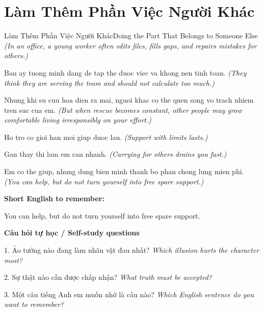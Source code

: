 \section{Làm Thêm Phần Việc Người Khác}
\begin{truyen}{Làm Thêm Phần Việc Người Khác}{Doing the Part That Belongs to Someone Else}
\textit{(In an office, a young worker often edits files, fills gaps, and repairs mistakes for others.)}

Ban ay tuong minh dang de tap the duoc viec va khong nen tinh toan.
\textit{(They think they are serving the team and should not calculate too much.)}

Nhung khi su cuu hoa dien ra mai, nguoi khac co the quen song vo trach nhiem tren suc cua em.
\textit{(But when rescue becomes constant, other people may grow comfortable living irresponsibly on your effort.)}

Ho tro co gioi han moi giup duoc lau.
\textit{(Support with limits lasts.)}

Gan thay thi lam em can nhanh.
\textit{(Carrying for others drains you fast.)}

\end{truyen}

\begin{baihoc}
Em co the giup, nhung dung bien minh thanh bo phan chong lung mien phi.
\textit{(You can help, but do not turn yourself into free spare support.)}
\end{baihoc}

\begin{ghinhoanh}
\textbf{Short English to remember:}

You can help, but do not turn yourself into free spare support.

\end{ghinhoanh}

\begin{tuhocnhanh}
\textbf{Câu hỏi tự học / Self-study questions}

1. Ảo tưởng nào đang làm nhân vật đau nhất? \textit{Which illusion hurts the character most?}

2. Sự thật nào cần được chấp nhận? \textit{What truth must be accepted?}

3. Một câu tiếng Anh em muốn nhớ là câu nào? \textit{Which English sentence do you want to remember?}
\end{tuhocnhanh}
\ngancach

